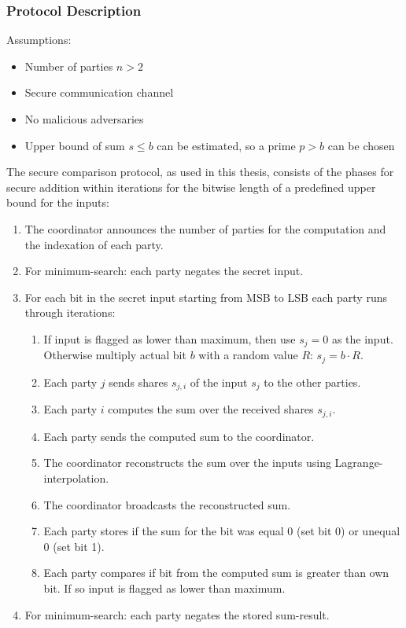 \subsubsection{Protocol Description}
Assumptions:
\begin{itemize}
	\item Number of parties $n>2$
	\item Secure communication channel
	\item No malicious adversaries
	\item Upper bound of sum $s \leq b$ can be estimated, so a prime $p > b$ can be chosen 
\end{itemize}
The secure comparison protocol, as used in this thesis, consists of the phases for secure addition within iterations for the bitwise length of a predefined upper bound for the inputs: 
\begingroup
\sloppy
\begin{enumerate}
	\item The coordinator announces the number of parties for the computation and the indexation of each party.
	\item For minimum-search: each party negates the secret input.
	\item For each bit in the secret input starting from \gls{MSB} to \gls{LSB} each party runs through iterations:
	\begin{enumerate}
		\item If input is flagged as lower than maximum, then use $s_j=0$ as the input. Otherwise multiply actual bit $b$ with a random value $R$: $s_j=b \cdot R$.
		\item Each party $j$ sends shares $s_{j,i}$ of the input $s_j$ to the other parties.
		\item Each party $i$ computes the sum over the received shares $s_{j,i}$.
		\item Each party sends the computed sum to the coordinator.
		\item The coordinator reconstructs the sum over the inputs using Lagrange-interpolation.
		\item The coordinator broadcasts the reconstructed sum.
		\item Each party stores if the sum for the bit was equal 0 (set bit 0) or unequal 0 (set bit 1).
		\item Each party compares if bit from the computed sum is greater than own bit. If so input is flagged as lower than maximum.
	\end{enumerate}
	\item For minimum-search: each party negates the stored sum-result.
\end{enumerate}
\endgroup

